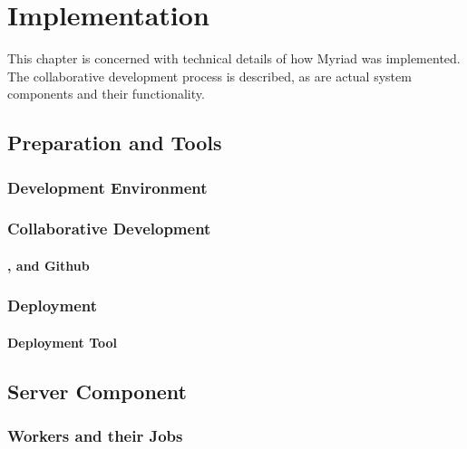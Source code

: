 \chapter{Implementation}
\label{chapter:Implementation}

This chapter is concerned with technical details of how Myriad was implemented. The collaborative development process is described, as are actual system components and their functionality.

\section{Preparation and Tools}



\subsection{Development Environment}



\subsection{Collaborative Development}



\subsubsection{,  and Github}



\subsection{Deployment}
\label{subsection:Deployment}



\subsubsection{Deployment Tool }




\section{Server Component}


\subsection{Workers and their Jobs}


